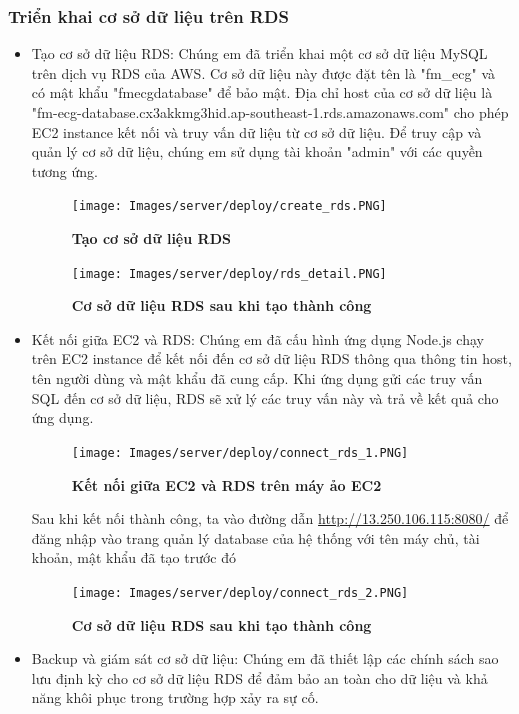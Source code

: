 \subsubsection{Triển khai cơ sở dữ liệu trên RDS}
\begin{itemize}
  \item Tạo cơ sở dữ liệu RDS: Chúng em đã triển khai một cơ sở dữ liệu MySQL trên dịch vụ RDS của AWS. Cơ sở dữ liệu này được đặt tên là "fm\_ecg" và có mật khẩu "fmecgdatabase" để bảo mật. Địa chỉ host của cơ sở dữ liệu là "fm-ecg-database.cx3akkmg3hid.ap-southeast-1.rds.amazonaws.com" cho phép EC2 instance kết nối và truy vấn dữ liệu từ cơ sở dữ liệu. Để truy cập và quản lý cơ sở dữ liệu, chúng em sử dụng tài khoản "admin" với các quyền tương ứng.
  
  \begin{figure}[H]
    \centering
    \texttt{[image: Images/server/deploy/create\_rds.PNG]}
    \caption[Tạo cơ sở dữ liệu RDS]{\bfseries \fontsize{12pt}{0pt}
    \selectfont Tạo cơ sở dữ liệu RDS}
    \label{create_rds} %
  \end{figure}


  \begin{figure}[H]
    \centering
    \texttt{[image: Images/server/deploy/rds\_detail.PNG]}
    \caption[Cơ sở dữ liệu RDS sau khi tạo thành công]{\bfseries \fontsize{12pt}{0pt}
    \selectfont Cơ sở dữ liệu RDS sau khi tạo thành công}
    \label{rds_detail} %
  \end{figure}

  \item Kết nối giữa EC2 và RDS: Chúng em đã cấu hình ứng dụng Node.js chạy trên EC2 instance để kết nối đến cơ sở dữ liệu RDS thông qua thông tin host, tên người dùng và mật khẩu đã cung cấp. Khi ứng dụng gửi các truy vấn SQL đến cơ sở dữ liệu, RDS sẽ xử lý các truy vấn này và trả về kết quả cho ứng dụng.
  

  \begin{figure}[H]
    \centering
    \texttt{[image: Images/server/deploy/connect\_rds\_1.PNG]}
    \caption[Kết nối giữa EC2 và RDS trên máy ảo EC2]{\bfseries \fontsize{12pt}{0pt}
    \selectfont Kết nối giữa EC2 và RDS trên máy ảo EC2}
    \label{rds_detail} %
  \end{figure}

  Sau khi kết nối thành công, ta vào đường dẫn \underline{http://13.250.106.115:8080/} để đăng nhập vào trang quản lý database của hệ thống với tên máy chủ, tài khoản, mật khẩu đã tạo trước đó


  \begin{figure}[H]
    \centering
    \texttt{[image: Images/server/deploy/connect\_rds\_2.PNG]}
    \caption[Cơ sở dữ liệu RDS sau khi tạo thành công]{\bfseries \fontsize{12pt}{0pt}
    \selectfont Cơ sở dữ liệu RDS sau khi tạo thành công}
    \label{rds_detail} %
  \end{figure}


  \item Backup và giám sát cơ sở dữ liệu: Chúng em đã thiết lập các chính sách sao lưu định kỳ cho cơ sở dữ liệu RDS để đảm bảo an toàn cho dữ liệu và khả năng khôi phục trong trường hợp xảy ra sự cố.
\end{itemize}


